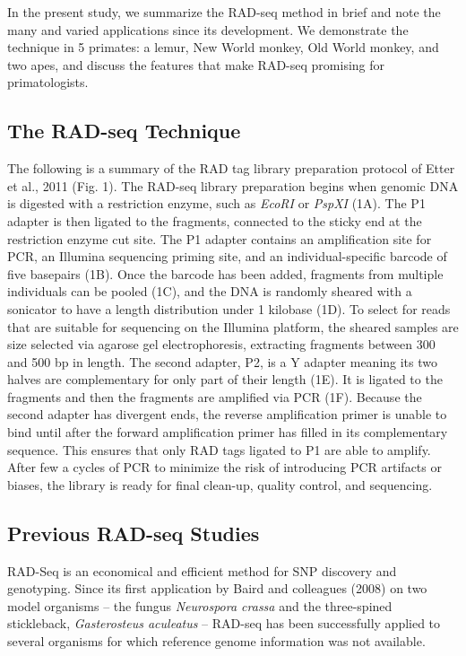 \documentclass[12pt]{article}
\begin{document}
In the present study, we summarize the RAD-seq method in brief and note the many and varied applications since its development. We demonstrate the technique in 5 primates: a lemur, New World monkey, Old World monkey, and two apes, and discuss the features that make RAD-seq promising for primatologists.  

\subsection{The RAD-seq Technique}

The following is a summary of the RAD tag library preparation protocol of Etter et al., 2011 (Fig. 1). The RAD-seq library preparation begins when genomic DNA is digested with a restriction enzyme, such as \emph{EcoRI} or \emph{PspXI} (1A). The P1 adapter is then ligated to the fragments, connected to the sticky end at the restriction enzyme cut site. The P1 adapter contains an amplification site for PCR, an Illumina sequencing priming site, and an individual-specific barcode of five basepairs (1B). Once the barcode has been added, fragments from multiple individuals can be pooled (1C), and the DNA is randomly sheared with a sonicator to have a length distribution under 1 kilobase (1D). To select for reads that are suitable for sequencing on the Illumina platform, the sheared samples are size selected via agarose gel electrophoresis, extracting fragments between 300 and 500 bp in length. The second adapter, P2, is a Y adapter meaning its two halves are complementary for only part of their length (1E). It is ligated to the fragments and then the fragments are amplified via PCR (1F). Because the second adapter has divergent ends, the reverse amplification primer is unable to bind until after the forward amplification primer has filled in its complementary sequence. This ensures that only RAD tags ligated to P1 are able to amplify. After few a cycles of PCR to minimize the risk of introducing PCR artifacts or biases, the library is ready for final clean-up, quality control, and sequencing.

\subsection{Previous RAD-seq Studies}

RAD-Seq is an economical and efficient method for SNP discovery and genotyping. Since its first application by Baird and colleagues (2008) on two model organisms – the fungus \emph{Neurospora crassa} and the three-spined stickleback, \emph{Gasterosteus aculeatus} – RAD-seq has been successfully applied to several organisms for which reference genome information was not available. 
\end{document}
